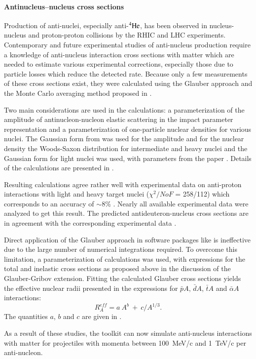 \paragraph{Antinucleus--nucleus cross sections}
Production of anti-nuclei, especially anti-$^4{\rm He}$, has been observed in
nucleus-nucleus and proton-proton collisions by the RHIC and LHC experiments. 
Contemporary and future experimental studies of anti-nucleus production require
a knowledge of anti-nucleus interaction cross sections with matter which are 
needed to estimate various experimental corrections, especially those due to 
particle losses which reduce the detected rate.  Because only a few measurements
of these cross sections exist, they were calculated using the Glauber approach 
\cite{hadbib:AntiA1,hadbib:AntiA2,hadbib:AntiA3} and the Monte Carlo averaging 
method proposed in \cite{hadbib:AntiA4,hadbib:AntiA5}.

Two main considerations are used in the calculations: a parameterization of the
amplitude of antinucleon-nucleon elastic scattering in the impact parameter
representation and a parameterization of one-particle nuclear densities for
various nuclei. The Gaussian form from \cite{hadbib:AntiA1,hadbib:AntiA3} was
used for the amplitude and for the nuclear density the Woods-Saxon distribution
for intermediate and heavy nuclei and the Gaussian form for light nuclei was 
used, with parameters from the paper \cite{hadbib:AntiA6}. Details of the 
calculations are presented in \cite{hadbib:AntiA7}.

Resulting calculations agree rather well with experimental data on anti-proton
interactions with light and heavy target nuclei ($\chi^2/NoF$ = 258/112) which 
corresponds to an accuracy of $\sim $8\% \cite{hadbib:AntiA7}.  Nearly all
available experimental data were analyzed to get this result.  The predicted 
antideuteron-nucleus cross sections are in agreement with the corresponding 
experimental data \cite{hadbib:AntiA8}.

Direct application of the Glauber approach in software packages like \Gfour{}
is ineffective due to the large number of numerical integrations required. To 
overcome this limitation, a parameterization of calculations 
\cite{hadbib:ggepjc,hadbib:ggnimb} was used, with expressions for the total 
and inelastic cross sections as proposed above in the discussion of the 
Glauber-Gribov extension. Fitting the calculated Glauber cross sections
yields the effective nuclear radii presented in the expressions for $\bar pA$,
$\bar dA$, $\bar tA$ and $\bar \alpha A$ interactions:
\\
$$
R^{eff}_A=a\ A^b\ + \ c/A^{1/3}.
$$
The quantities $a$, $b$ and $c$ are given in \cite{hadbib:AntiA7}.

As a result of these studies, the \Gfour{} toolkit can now simulate 
anti-nucleus interactions with matter for projectiles with momenta between 
100~MeV/c and 1~TeV/c per anti-nucleon.

